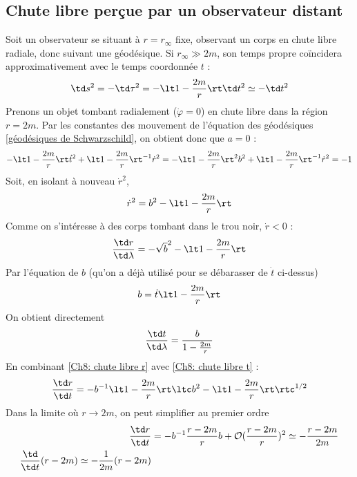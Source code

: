\subsection{Chute libre perçue par un observateur distant}
Soit un observateur se situant à $r = r_\infty$ fixe, observant un corps en chute libre radiale, donc suivant une géodésique. Si $r_\infty\gg 2m$, son temps propre coïncidera approximativement avec le temps coordonnée $t$ : 
\begin{equation}
    \td s^2 = - \td \tau^2 = - \lt 1 - \frac{2m}{r} \rt \td t^2 \simeq - \td t^2
\end{equation}
Prenons un objet tombant radialement ($\dot{\varphi} = 0$) en chute libre dans la région $r=2m$. Par les constantes des mouvement de l'équation des géodésiques \ref{géodésiques de Schwarzschild}, on obtient donc que $a=0$ :
\begin{align}
    - \lt 1 - \frac{2m}{r} \rt \dot{t}^2 + \lt 1 - \frac{2m}{r} \rt^{-1} \dot{r}^2 = - \lt 1 - \frac{2m}{r} \rt^2 b^2 + \lt 1 - \frac{2m}{r} \rt^{-1} \dot{r}^2 =-1
\end{align}
Soit, en isolant à nouveau $\dot{r}^2$,
\begin{equation}
    \dot{r}^2 = b^2 - \lt 1-\frac{2m}{r} \rt
\end{equation}
Comme on s'intéresse à des corps tombant dans le trou noir, $\dot{r}<0$ :
\begin{equation}
    \label{Ch8: chute libre r}
    \frac{\td r}{\td \lambda} = - \sqrt b^2 - \lt 1 - \frac{2m}{r} \rt
\end{equation}
Par l'équation de $b$ (qu'on a déjà utilisé pour se débarasser de $\dot{t}$ ci-dessus)
\begin{equation}
    b = \dot{t} \lt 1 - \frac{2m}{r} \rt
\end{equation}
On obtient directement
\begin{equation}
    \label{Ch8: chute libre t}
    \frac{\td t}{\td \lambda} = \frac{b}{1 - \frac{2m}{r}}
\end{equation}
En combinant \ref{Ch8: chute libre r} avec \ref{Ch8: chute libre t} :
\begin{align}
    \frac{\td r}{\td t} = - b^{-1} \lt 1 - \frac{2m}{r} \rt \ltc b^2 - \lt 1 - \frac{2m}{r} \rt \rtc^{1/2}
\end{align}
Dans la limite où $r \to 2m$, on peut simplifier au premier ordre
\begin{align}
    \frac{\td r}{\td t} &= - b^{-1} \frac{r - 2m}{r} b + \mathcal{O}(\frac{r-2m}{r})^2 \simeq - \frac{r-2m}{2m}\\
    \frac{\td }{\td t}(r-2m) \simeq - \frac{1}{2m} (r-2m)
\end{align}
